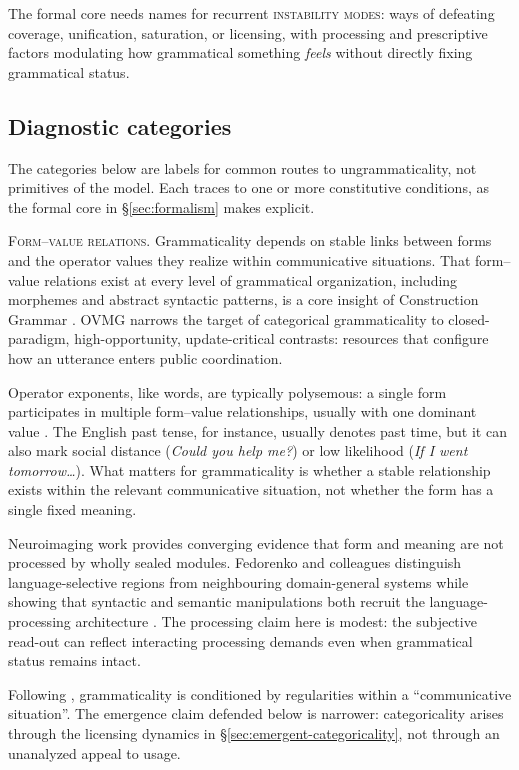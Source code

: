 \documentclass[12pt,letterpaper]{article}
\newcommand{\term}[1]{\textsc{#1}}
\newcommand{\mention}[1]{\textit{#1}}
\begin{document}
The formal core needs names for recurrent \term{instability modes}: ways of defeating coverage, unification, saturation, or licensing, with processing and prescriptive factors modulating how grammatical something \emph{feels} without directly fixing grammatical status.

\subsection{Diagnostic categories}\label{sec:core-components}

The categories below are labels for common routes to ungrammaticality, not primitives of the model. Each traces to one or more constitutive conditions, as the formal core in \S\ref{sec:formalism} makes explicit.

\noindent\textsc{Form--value relations.} Grammaticality depends on stable links between forms and the operator values they realize within communicative situations. That form--value relations exist at every level of grammatical organization, including morphemes and abstract syntactic patterns, is a core insight of Construction Grammar \autocite{goldberg1995constructions}. OVMG narrows the target of categorical grammaticality to closed-paradigm, high-opportunity, update-critical contrasts: resources that configure how an utterance enters public coordination.

Operator exponents, like words, are typically polysemous: a single form participates in multiple form--value relationships, usually with one dominant value \autocite{Kilgarriff2004}. The English past tense, for instance, usually denotes past time, but it can also mark social distance (\mention{Could you help me?}) or low likelihood (\mention{If I went tomorrow\dots}). What matters for grammaticality is whether a stable relationship exists within the relevant communicative situation, not whether the form has a single fixed meaning.

Neuroimaging work provides converging evidence that form and meaning are not processed by wholly sealed modules. Fedorenko and colleagues distinguish language-selective regions from neighbouring domain-general systems while showing that syntactic and semantic manipulations both recruit the language-processing architecture \autocite{Fedorenko2011, Fedorenko2012, Fedorenko2024}. The processing claim here is modest: the subjective read-out can reflect interacting processing demands even when grammatical status remains intact.

Following \textcite[3]{wiese2023}, grammaticality is conditioned by regularities within a \enquote{communicative situation}. The emergence claim defended below is narrower: categoricality arises through the licensing dynamics in \S\ref{sec:emergent-categoricality}, not through an unanalyzed appeal to usage.
\end{document}
